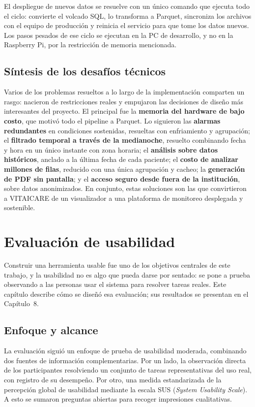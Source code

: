 \documentclass[12pt,a4paper]{article}
\begin{document}
    El despliegue de nuevos datos se resuelve con un único comando que ejecuta todo el ciclo: convierte el volcado SQL, lo transforma a Parquet, sincroniza los archivos con el equipo de producción y reinicia el servicio para que tome los datos nuevos. Los pasos pesados de ese ciclo se ejecutan en la PC de desarrollo, y no en la Raspberry Pi, por la restricción de memoria mencionada.

    \subsection{Síntesis de los desafíos técnicos}
    Varios de los problemas resueltos a lo largo de la implementación comparten un rasgo: nacieron de restricciones reales y empujaron las decisiones de diseño más interesantes del proyecto. El principal fue la \textbf{memoria del hardware de bajo costo}, que motivó todo el pipeline a Parquet. Lo siguieron las \textbf{alarmas redundantes} en condiciones sostenidas, resueltas con enfriamiento y agrupación; el \textbf{filtrado temporal a través de la medianoche}, resuelto combinando fecha y hora en un único instante con zona horaria; el \textbf{análisis sobre datos históricos}, anclado a la última fecha de cada paciente; el \textbf{costo de analizar millones de filas}, reducido con una única agrupación y cacheo; la \textbf{generación de PDF sin pantalla}; y el \textbf{acceso seguro desde fuera de la institución}, sobre datos anonimizados. En conjunto, estas soluciones son las que convirtieron a VITAICARE de un visualizador a una plataforma de monitoreo desplegada y sostenible.
\newpage

\section{Evaluación de usabilidad}

    Construir una herramienta usable fue uno de los objetivos centrales de este trabajo, y la usabilidad no es algo que pueda darse por sentado: se pone a prueba observando a las personas usar el sistema para resolver tareas reales. Este capítulo describe cómo se diseñó esa evaluación; sus resultados se presentan en el Capítulo~8.

    \subsection{Enfoque y alcance}
    La evaluación siguió un enfoque de prueba de usabilidad moderada, combinando dos fuentes de información complementarias. Por un lado, la observación directa de los participantes resolviendo un conjunto de tareas representativas del uso real, con registro de su desempeño. Por otro, una medida estandarizada de la percepción global de usabilidad mediante la escala SUS (\textit{System Usability Scale}). A esto se sumaron preguntas abiertas para recoger impresiones cualitativas.
\end{document}
